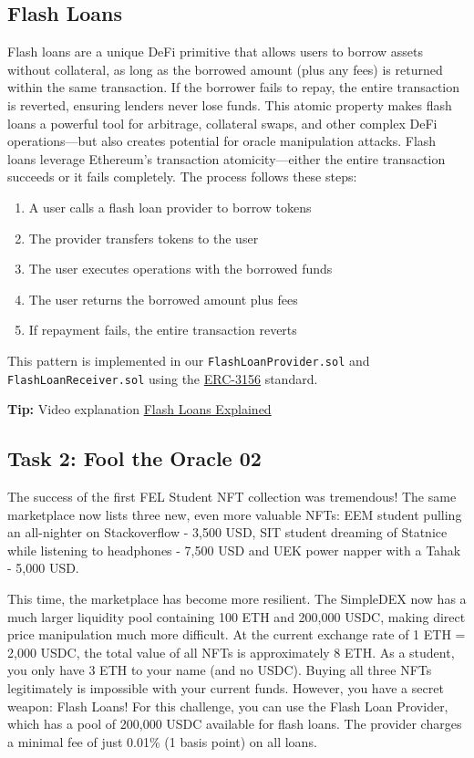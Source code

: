 \documentclass[12pt]{article}
\begin{document}
\subsection*{Flash Loans}

Flash loans are a unique DeFi primitive that allows users to borrow assets without collateral, as long as the borrowed amount (plus any fees) is returned within the same transaction. If the borrower fails to repay, the entire transaction is reverted, ensuring lenders never lose funds. This atomic property makes flash loans a powerful tool for arbitrage, collateral swaps, and other complex DeFi operations—but also creates potential for oracle manipulation attacks. Flash loans leverage Ethereum's transaction atomicity—either the entire transaction succeeds or it fails completely. The process follows these steps:

\begin{enumerate}
    \item A user calls a flash loan provider to borrow tokens
    \item The provider transfers tokens to the user
    \item The user executes operations with the borrowed funds
    \item The user returns the borrowed amount plus fees
    \item If repayment fails, the entire transaction reverts
\end{enumerate}

This pattern is implemented in our \texttt{FlashLoanProvider.sol} and \texttt{FlashLoanReceiver.sol} using the \href{https://eips.ethereum.org/EIPS/eip-3156}{ERC-3156} standard.

\medskip
\noindent
\textbf{Tip:} Video explanation \href{https://www.youtube.com/watch?v=mCJUhnXQ76s}{Flash Loans Explained}

\subsection*{Task 2: Fool the Oracle 02}

The success of the first FEL Student NFT collection was tremendous! The same marketplace now lists three new, even more valuable NFTs: EEM student pulling an all-nighter on Stackoverflow - 3,500 USD, SIT student dreaming of Statnice while listening to headphones - 7,500 USD and UEK power napper with a Tahak - 5,000 USD.

This time, the marketplace has become more resilient. The SimpleDEX now has a much larger liquidity pool containing 100 ETH and 200,000 USDC, making direct price manipulation much more difficult. At the current exchange rate of 1 ETH = 2,000 USDC, the total value of all NFTs is approximately 8 ETH. As a student, you only have 3 ETH to your name (and no USDC). Buying all three NFTs legitimately is impossible with your current funds. However, you have a secret weapon: Flash Loans! For this challenge, you can use the Flash Loan Provider, which has a pool of 200,000 USDC available for flash loans. The provider charges a minimal fee of just 0.01\% (1 basis point) on all loans.
\end{document}
